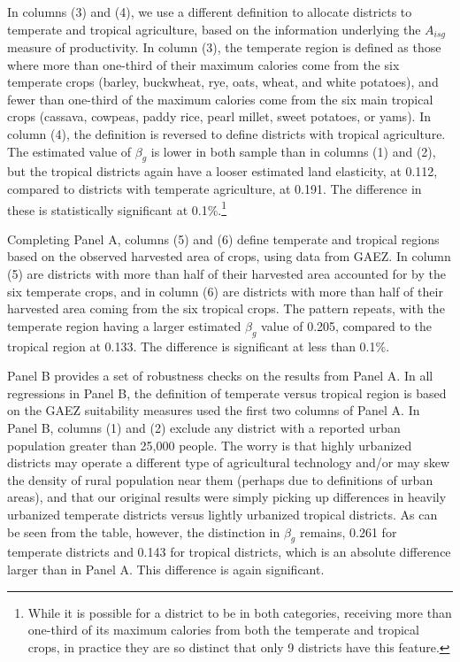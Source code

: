 \documentclass[11pt]{article}
\begin{document}
In columns (3) and (4), we use a different definition to allocate districts to temperate and tropical agriculture, based on the information underlying the $A_{isg}$ measure of productivity. In column (3), the temperate region is defined as those where more than one-third of their maximum calories come from the six temperate crops (barley, buckwheat, rye, oats, wheat, and white potatoes), and fewer than one-third of the maximum calories come from the six main tropical crops (cassava, cowpeas, paddy rice, pearl millet, sweet potatoes, or yams). In column (4), the definition is reversed to define districts with tropical agriculture. The estimated value of $\beta_g$ is lower in both sample than in columns (1) and (2), but the tropical districts again have a looser estimated land elasticity, at 0.112, compared to districts with temperate agriculture, at 0.191. The difference in these is statistically significant at 0.1\%.\footnote{While it is possible for a district to be in both categories, receiving more than one-third of its maximum calories from both the temperate and tropical crops, in practice they are so distinct that only 9 districts have this feature.}

Completing Panel A, columns (5) and (6) define temperate and tropical regions based on the observed harvested area of crops, using data from GAEZ. In column (5) are districts with more than half of their harvested area accounted for by the six temperate crops, and in column (6) are districts with more than half of their harvested area coming from the six tropical crops. The pattern repeats, with the temperate region having a larger estimated $\beta_g$ value of 0.205, compared to the tropical region at 0.133. The difference is significant at less than 0.1\%.

Panel B provides a set of robustness checks on the results from Panel A. In all regressions in Panel B, the definition of temperate versus tropical region is based on the GAEZ suitability measures used the first two columns of Panel A. In Panel B, columns (1) and (2) exclude any district with a reported urban population greater than 25,000 people. The worry is that highly urbanized districts may operate a different type of agricultural technology and/or may skew the density of rural population near them (perhaps due to definitions of urban areas), and that our original results were simply picking up differences in heavily urbanized temperate districts versus lightly urbanized tropical districts. As can be seen from the table, however, the distinction in $\beta_g$ remains, 0.261 for temperate districts and 0.143 for tropical districts, which is an absolute difference larger than in Panel A. This difference is again significant.
\end{document}
